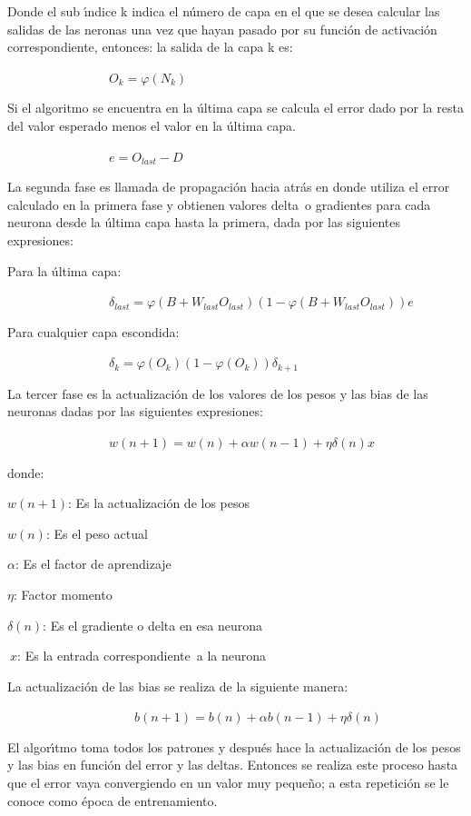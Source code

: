 Donde el sub \'{\i}ndice k indica el n\'{u}mero de capa en el que se desea
calcular las salidas de las neronas una vez que hayan pasado por su
funci\'{o}n de activaci\'{o}n correspondiente, entonces: la salida de la capa
k es:

$\qquad\qquad\qquad\qquad O_{k}=\varphi(N_{k})$

Si el algoritmo se encuentra en la \'{u}ltima capa se calcula el error dado
por la resta del valor esperado menos el valor en la \'{u}ltima capa.

$\qquad\qquad\qquad\qquad e=O_{last}-D$

La segunda fase es llamada de propagaci\'{o}n hacia atr\'{a}s en donde utiliza
el error calculado en la primera fase y obtienen valores delta\ o gradientes
para cada neurona desde la \'{u}ltima capa hasta la primera, dada por las
siguientes expresiones:

Para la \'{u}ltima capa:

$\qquad\qquad\qquad\qquad\delta_{last}=\varphi(B+W_{last}O_{last}%
)(1-\varphi(B+W_{last}O_{last}))e$

\bigskip Para cualquier capa escondida:

$\qquad\qquad\qquad\qquad\delta_{k}=\varphi(O_{k})(1-\varphi(O_{k}%
))\delta_{k+1}$

La tercer fase es la actualizaci\'{o}n de los valores de los pesos y las bias
de las neuronas dadas por las siguientes expresiones:

$\qquad\qquad\qquad\qquad w(n+1)=w(n)+\alpha w(n-1)+\eta\delta(n)x$

donde:

$w(n+1)$: Es la actualizaci\'{o}n de los pesos

$w(n)$: Es el peso actual

$\alpha$: Es el factor de aprendizaje

$\eta$: Factor momento

$\delta(n)$: Es el gradiente o delta en esa neurona

$\ x$: Es la entrada correspondiente\ a la neurona

\bigskip La actualizaci\'{o}n de las bias se realiza de la siguiente manera:

$\qquad\qquad\qquad\qquad\qquad b(n+1)=b(n)+\alpha b(n-1)+\eta\delta(n) $

El algor\'{\i}tmo toma todos los patrones y despu\'{e}s hace la
actualizaci\'{o}n de los pesos y las bias en funci\'{o}n del error y las
deltas. Entonces se realiza este proceso hasta que el error vaya convergiendo
en un valor muy peque\~{n}o; a esta repetici\'{o}n se le conoce como \'{e}poca
de entrenamiento.

